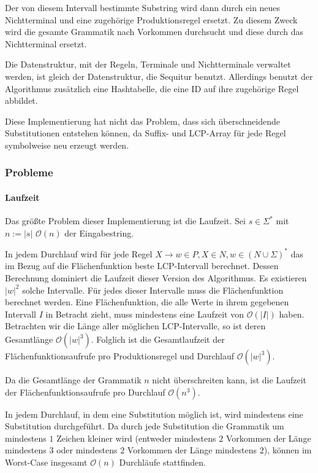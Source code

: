 Der von diesem Intervall bestimmte Substring wird dann durch ein neues Nichtterminal und eine zugehörige Produktionsregel ersetzt. Zu diesem Zweck wird die gesamte Grammatik nach Vorkommen durchsucht und diese durch das Nichtterminal ersetzt.

Die Datenstruktur, mit der Regeln, Terminale und Nichtterminale verwaltet werden, ist gleich der Datenstruktur, die Sequitur benutzt. Allerdings benutzt der Algorithmus zusätzlich eine Hashtabelle, die eine ID auf ihre zugehörige Regel abbildet.

Diese Implementierung hat nicht das Problem, dass sich überschneidende Substitutionen entstehen können, da Suffix- und LCP-Array für jede Regel symbolweise neu erzeugt werden. 

\subsubsection{Probleme}

\paragraph{Laufzeit}
Das größte Problem dieser Implementierung ist die Laufzeit. Sei $s \in \Sigma^*$ mit $n := |s|$ $\mathcal{O}(n)$ der Eingabestring.

In jedem Durchlauf wird für jede Regel $X \rightarrow w \in P, X \in N, w \in (N \cup \Sigma)^*$ das im Bezug auf die Flächenfunktion beste LCP-Intervall berechnet. Dessen Berechnung dominiert die Laufzeit dieser Version des Algorithmus. 
Es existieren $|w|^2$ solche Intervalle.
Für jedes dieser Intervalle muss die Flächenfunktion berechnet werden. Eine Flächenfunktion, die alle Werte in ihrem gegebenen Intervall $I$ in Betracht zieht, muss mindestens eine Laufzeit von $\mathcal{O}(|I|)$ haben. Betrachten wir die Länge aller möglichen LCP-Intervalle, so ist deren Gesamtlänge $\mathcal{O}(|w|^3)$. Folglich ist die Gesamtlaufzeit der Flächenfunktionsaufrufe pro Produktionsregel und Durchlauf $\mathcal{O}(|w|^3)$. 

Da die Gesamtlänge der Grammatik $n$ nicht überschreiten kann, ist die Laufzeit der Flächenfunktionsaufrufe pro Durchlauf $\mathcal{O}(n^3)$. 

In jedem Durchlauf, in dem eine Substitution möglich ist, wird mindestens eine Substitution durchgeführt. Da durch jede Substitution die Grammatik um mindestens $1$ Zeichen kleiner wird (entweder mindestens $2$ Vorkommen der Länge mindestens $3$ oder mindestens $2$ Vorkommen der Länge mindestens $2$), können im Worst-Case insgesamt $\mathcal{O}(n)$ Durchläufe stattfinden.

